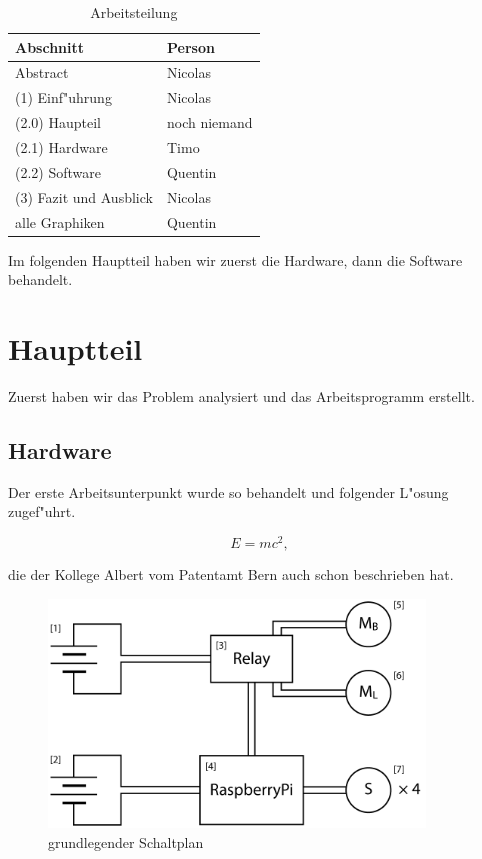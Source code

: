 \documentclass[a4paper,12pt]{article}
\begin{document}
\begin{table}[h]
	\centering
	\begin{tabular}{|l|l|}
	\hline
		Abschnitt & Person \\ \hline
		Abstract & Nicolas \\
		(1) Einf"uhrung & Nicolas \\
		(2.0) Haupteil & noch niemand \\
		(2.1) Hardware & Timo \\
		(2.2) Software & Quentin \\
		(3) Fazit und Ausblick & Nicolas \\
		alle Graphiken & Quentin \\
	\hline
	\end{tabular}
	\caption{Arbeitsteilung}
	\label{Tab1}
\end{table}

Im folgenden Hauptteil haben wir zuerst die Hardware, dann die Software behandelt.

\section{Hauptteil}\label{sec2}

Zuerst haben wir das Problem analysiert und das Arbeitsprogramm erstellt.

\subsection{Hardware}\label{sec2.1}

Der erste Arbeitsunterpunkt wurde so behandelt und folgender L"osung zugef"uhrt.

\begin{equation}
	E = mc^2 ,
\end{equation}

die der Kollege Albert vom Patentamt Bern \cite{ModMyPi} auch schon beschrieben hat.

\begin{figure}[h]
	\centering
	\includegraphics[width=10cm]{./media/circuit_general.png}
	\caption{grundlegender Schaltplan}
	\label{Fig2}
\end{figure}
\end{document}
